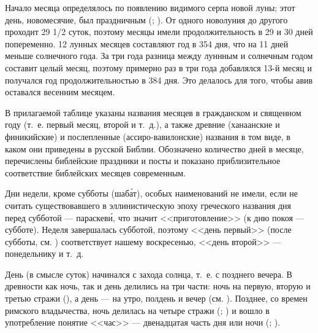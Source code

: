 Начало месяца определялось по появлению видимого серпа новой луны; этот
день, новомесячие, был праздничным (; ).
От одного новолуния до другого проходит 29 1/2 суток, поэтому месяцы имели
продолжительность в 29 и 30 дней попеременно.
12 лунных месяцев составляют год в 354 дня, что на 11 дней меньше солнечного
года.
За три года разница между луннным и солнечным годом составит целый месяц,
поэтому примерно раз в три года добавлялся 13-й месяц и получался год
продолжительностью в 384 дня.
Это делалось для того, чтобы авив оставался весенним месяцем.

В прилагаемой таблице указаны названия месяцев в гражданском и священном 
году (т.~е. первый месяц, второй и т.~д.), а также древние (ханаанские и
финикийские) и послепленные (ассиро-вавилонские) названия в том виде, в
каком они приведены в русской Библии. Обозначено количество дней в
месяце, перечислены библейские праздники и посты и показано
приблизительное соответствие библейских месяцев современным.

Дни недели, кроме субботы (шаб\'ат), особых наименований не имели, если не
считать существовавшего в эллинистическую эпоху греческого названия дня
перед субботой --- параскев\'и, что значит <<приготовление>>
(к дню покоя --- субботе).
Неделя завершалась субботой, поэтому <<день первый>> (после субботы, см.
) соответствует нашему воскресенью,
<<день второй>> --- понедельнику и т.~д.

День (в смысле суток) начинался с захода солнца, т.~е. с позднего
вечера. В древности как ночь, так и день делились на три части: ночь на
первую, вторую и третью стражи (), а
день --- на утро, полдень и вечер (см. ).
Позднее, со времен римского владычества, ночь делилась на четыре стражи
(; ) и вошло в употребление понятие <<час>> ---
двенадцатая часть дня или ночи (; ).

